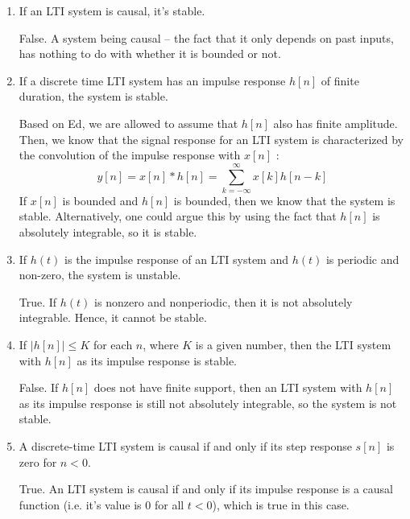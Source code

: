 \documentclass[10pt]{article}
\begin{document}
	\begin{enumerate}[label=\alph*)]
		\item If an LTI system is causal, it's stable. 

			\begin{solution}
				False. A system being causal -- the fact that it only depends on past inputs, has nothing to do 
				with whether it is bounded or not.
			\end{solution}
		\item If a discrete time LTI system has an impulse response \( h[n] \) of finite duration, the system 
			is stable. 

			\begin{solution}
				Based on Ed, we are allowed to assume that \( h[n] \) also has finite amplitude. Then, we know 
				that the signal response for an LTI system is characterized by the convolution of the impulse 
				response with \( x[n] \) :
				\[
					y[n] = x[n] * h[n] = \sum_{k = -\infty}^{\infty} x[k] h[n-k] 
				\] 
				If \( x[n] \) is bounded and \( h[n]  \) is bounded, then we know that the system is stable. 
				Alternatively, one could argue this by using the fact that \( h[n] \) is absolutely 
				integrable, so it is stable. 
			\end{solution}
		\item If \( h(t) \) is the impulse response of an LTI system and \( h(t) \) is periodic and non-zero, the 
			system is unstable. 

			\begin{solution}
				True. If \( h(t) \) is nonzero and nonperiodic, then it is not absolutely integrable. Hence, it cannot 
				be stable.
			\end{solution}
		\item If \( |h[n]| \le K \) for each \( n \), where \( K \) is a given number, then the LTI system with 
			\( h[n] \) as its impulse response is stable. 

			\begin{solution}
				False. If \( h[n] \) does not have finite support, then an LTI system with \( h[n] \) as its impulse
				response is still not absolutely integrable, so the system is not stable.
			\end{solution}
		\item A discrete-time LTI system is causal if and only if its step response \( s[n] \) is 
			zero for \( n < 0 \). 

			\begin{solution}
				True. An LTI system is causal if and only if its impulse response is a causal function (i.e. 
				it's value is 0 for all \( t < 0 \)), which is true in this case.  
			\end{solution}
	\end{enumerate}
	\pagebreak
\end{document}
